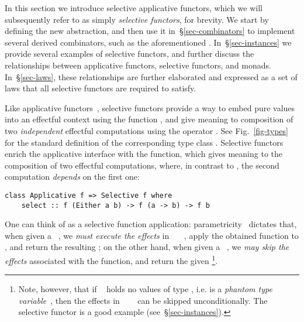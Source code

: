 
In this section we introduce selective applicative functors, which we will
subsequently refer to as simply \emph{selective functors}, for brevity. We start
by defining the new abstraction, and then use it in~\S\ref{sec-combinators} to
implement several derived combinators, such as the aforementioned .
In~\S\ref{sec-instances} we provide several examples of selective functors, and
further discuss the relationships between applicative functors, selective
functors, and monads. In~\S\ref{sec-laws}, these relationships are further
elaborated and expressed as a set of laws that all selective functors are
required to satisfy.

Like applicative functors~\citep{mcbride2008applicative}, selective functors
provide a way to embed pure values into an effectful context  using the
function , and give meaning to composition of two \emph{independent}
effectful computations using the operator \hs{<*>}. See Fig.~\ref{fig-types} for
the standard definition of the corresponding type class .
Selective functors enrich the applicative interface with the 
function, which gives meaning to the composition of two effectful computations,
where, in contrast to \hs{<*>}, the second computation \emph{depends} on the
first one:

\vspace{0.5mm}
\begin{verbatim}
class Applicative f => Selective f where
    select :: f (Either a b) -> f (a -> b) -> f b
\end{verbatim}
\vspace{0.5mm}

\noindent
One can think of  as a selective function application:
parametricity~\citep{wadler1989theorems} dictates that, when given a
~, we \emph{must execute the effects} in
~\hs{(}~\hs{->}~, apply the obtained function to , and
return the resulting ; on the other hand, when given a ~,
we \emph{may skip the effects} associated with the function, and return the
given \footnote{Note, however, that if ~ holds no values of
type , i.e.  is a \emph{phantom type
variable}~\cite{leijen2000domain}, then the effects in
~\hs{(}~\hs{->}~ can be skipped unconditionally. The
selective functor  is a good example (see~\S\ref{sec-instances}).}.

